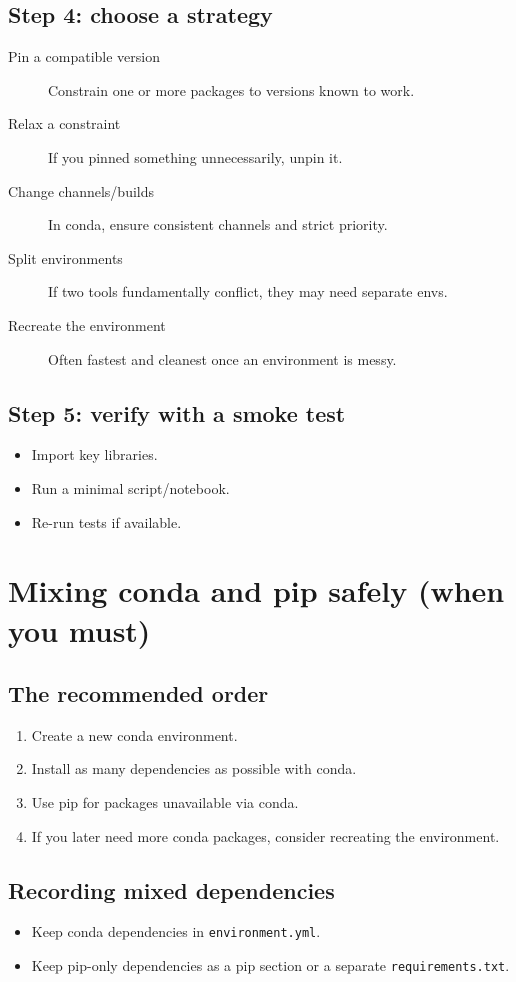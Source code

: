 \subsection{Step 4: choose a strategy}
\begin{description}
\item[Pin a compatible version] Constrain one or more packages to versions known to work.
\item[Relax a constraint] If you pinned something unnecessarily, unpin it.
\item[Change channels/builds] In conda, ensure consistent channels and strict priority.
\item[Split environments] If two tools fundamentally conflict, they may need separate envs.
\item[Recreate the environment] Often fastest and cleanest once an environment is messy.
\end{description}

\subsection{Step 5: verify with a smoke test}
\begin{itemize}
\item Import key libraries.
\item Run a minimal script/notebook.
\item Re-run tests if available.
\end{itemize}

\section{Mixing conda and pip safely (when you must)}
\subsection{The recommended order}
\begin{enumerate}
\item Create a new conda environment.
\item Install as many dependencies as possible with conda.
\item Use pip for packages unavailable via conda.
\item If you later need more conda packages, consider recreating the environment.
\end{enumerate}

\subsection{Recording mixed dependencies}
\begin{itemize}
\item Keep conda dependencies in \texttt{environment.yml}.
\item Keep pip-only dependencies as a pip section or a separate \texttt{requirements.txt}.
\end{itemize}

